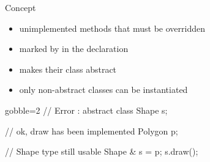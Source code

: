 \begin{frame}[fragile]
  \begin{block}{Concept}
    \begin{itemize}
    \item unimplemented methods that must be overridden
    \item marked by  in the declaration
    \item makes their class abstract
    \item only non-abstract classes can be instantiated
    \end{itemize}
  \end{block}
  \pause
  \begin{multicols}{2}
    \begin{cppcode*}{gobble=2}
      // Error : abstract class
      Shape s;

      // ok, draw has been implemented
      Polygon p;

      // Shape type still usable
      Shape & s = p;
      s.draw();
    \end{cppcode*}
    \columnbreak
  \end{multicols}
\end{frame}

